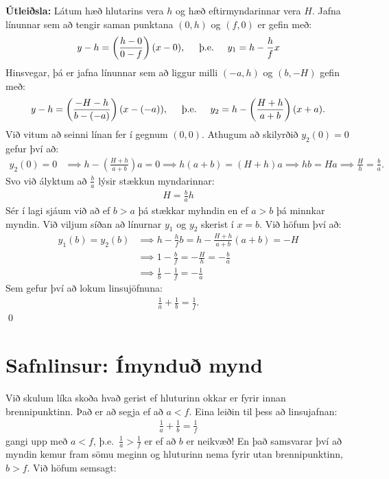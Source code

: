 \textbf{Útleiðsla:} Látum hæð hlutarins vera $h$ og hæð eftirmyndarinnar vera $H$. Jafna línunnar sem að tengir saman punktana $(0,h)$ og $(f,0)$ er gefin með:
\begin{align*}
    y - h = \left( \frac{h-0}{0-f} \right)(x-0), \hspace{0.5cm} \text{þ.e.} \hspace{0.5cm} y_1 = h - \frac{h}{f}x
\end{align*}
Hinsvegar, þá er jafna línunnar sem að liggur milli $(-a,h)$ og $(b,-H)$ gefin með:
\begin{align*}
    y-h = \left( \frac{-H-h}{b-(-a)} \right)(x-(-a)), \hspace{0.5cm} \text{þ.e.} \hspace{0.5cm} y_2 = h - \left( \frac{H+h}{a+b} \right)(x+a).
\end{align*}
Við vitum að seinni línan fer í gegnum $(0,0)$. Athugum að skilyrðið $y_2(0) = 0$ gefur því að:
\begin{align*}
    y_2(0) = 0 &\implies h - \left( \frac{H+h}{a+b} \right)a = 0 
    \implies h(a+b) = (H+h)a 
    \implies hb = Ha 
    \implies \frac{H}{h} = \frac{b}{a}.
\end{align*}
Svo við ályktum að $\frac{b}{a}$ lýsir stækkun myndarinnar:
\begin{align*}
    H = \frac{b}{a}h
\end{align*}
Sér í lagi sjáum við að ef $b>a$ þá stækkar myhndin en ef $a>b$ þá minnkar myndin. Við viljum síðan að línurnar $y_1$ og $y_2$ skerist í $x=b$. Við höfum því að:
\begin{align*}
    y_1(b) = y_2(b) &\implies h - \frac{h}{f}b = h- \frac{H+h}{a+b}\left(a+b\right) = -H \\
    &\implies 1 - \frac{b}{f} = -\frac{H}{h} = -\frac{b}{a} \\
    &\implies \frac{1}{b} - \frac{1}{f} = -\frac{1}{a}
\end{align*}
Sem gefur því að lokum linsujöfnuna:
\begin{align*}
    \frac{1}{a} + \frac{1}{b} = \frac{1}{f}.
\end{align*}
\qed

\section{Safnlinsur: Ímynduð mynd}

Við skulum líka skoða hvað gerist ef hluturinn okkar er fyrir innan brennipunktinn. Það er að segja ef að $a < f$. Eina leiðin til þess að linsujafnan:
\begin{align*}
    \frac{1}{a} + \frac{1}{b} = \frac{1}{f}
\end{align*}
gangi upp með $a < f$, þ.e.~$\frac{1}{a} > \frac{1}{f}$ er ef að $b$ er neikvæð! En það samsvarar því að myndin kemur fram sömu meginn og hluturinn nema fyrir utan brennipunktinn, $b > f$. Við höfum semsagt:

